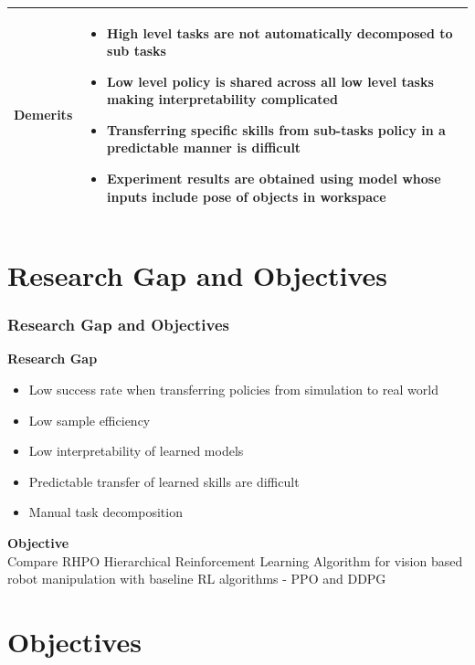 \documentclass{beamer}
\begin{document}
\begin{frame}[allowframebreaks]
\begin{tabular}{m{2.25cm} | m{9cm}}
			\textbf{Demerits} &
			\begin{itemize}
				\item High level tasks are not automatically decomposed to sub tasks
				\item Low level policy is shared across all low level tasks making interpretability complicated
				\item Transferring specific skills from sub-tasks policy in a predictable manner is difficult
				\item Experiment results are obtained using model whose inputs include pose of objects in workspace
			\end{itemize}\\
			\hline
			
		\end{tabular}
	\end{frame}
	
	\section{Research Gap and Objectives}
	\begin{frame}
		\frametitle{Research Gap and Objectives}
		\textbf{Research Gap}
		\begin{itemize}
			\item Low success rate when transferring policies from simulation to real world
			\item Low sample efficiency
			\item Low interpretability of learned models
			\item Predictable transfer of learned skills are difficult
			\item Manual task decomposition
		\end{itemize}
		\vspace{1em}
		\textbf{Objective} \\
		Compare RHPO Hierarchical Reinforcement Learning Algorithm for vision based robot manipulation with baseline RL algorithms - PPO and DDPG
	\end{frame}

	\section{Objectives}
\end{document}

